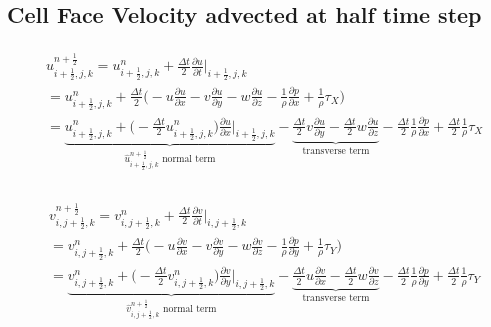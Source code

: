 \documentclass{article}
\numberwithin{equation}{subsection}
\begin{document}
\subsection{Cell Face Velocity advected at half time step}
\begin{align}
\begin{split}
& u_{i+\frac{1}{2},j,k}^{n+\frac{1}{2}} = u_{i+\frac{1}{2},j,k}^n + \frac{\Delta t}{2}\frac{\partial u}{\partial t}|_{i+\frac{1}{2},j,k}\\
& = u_{i+\frac{1}{2},j,k}^n + \frac{\Delta t}{2} \Big( -u\frac{\partial u}{\partial x} -v\frac{\partial u}{\partial y} -w\frac{\partial u}{\partial z} - \frac{1}{\rho}\frac{\partial p}{\partial x} + \frac{1}{\rho}\tau_X\Big) \\
& = \underbrace{u_{i+\frac{1}{2},j,k}^n + \Big( - \frac{\Delta t}{2} u_{i+\frac{1}{2},j,k}^n\Big)\frac{\partial u}{\partial x}|_{i+\frac{1}{2},j,k}}_\text{$\widehat{u}_{i+\frac{1}{2},j,k}^{n+\frac{1}{2}}$ normal term} -\underbrace{\frac{\Delta t}{2}v\frac{\partial u}{\partial y} - \frac{\Delta t}{2}w\frac{\partial u}{\partial z}}_\text{transverse term} - \frac{\Delta t}{2}\frac{1}{\rho}\frac{\partial p}{\partial x} + \frac{\Delta t}{2}\frac{1}{\rho}\tau_X \\
\end{split}
\end{align}

\begin{align}
\begin{split}
& v_{i,j+\frac{1}{2},k}^{n+\frac{1}{2}} = v_{i,j+\frac{1}{2},k}^n + \frac{\Delta t}{2}\frac{\partial v}{\partial t}|_{i,j+\frac{1}{2},k}\\
& = v_{i,j+\frac{1}{2},k}^n + \frac{\Delta t}{2} \Big( -u\frac{\partial v}{\partial x} -v\frac{\partial v}{\partial y} -w\frac{\partial v}{\partial z} - \frac{1}{\rho}\frac{\partial p}{\partial y} + \frac{1}{\rho}\tau_Y\Big) \\
& = \underbrace{v_{i,j+\frac{1}{2},k}^n + \Big( - \frac{\Delta t}{2} v_{i,j+\frac{1}{2},k}^n\Big)\frac{\partial v}{\partial y}|_{i,j+\frac{1}{2},k}}_\text{$\widehat{v}_{i,j+\frac{1}{2},k}^{n+\frac{1}{2}}$ normal term} -\underbrace{\frac{\Delta t}{2}u\frac{\partial v}{\partial x} - \frac{\Delta t}{2}w\frac{\partial v}{\partial z}}_\text{transverse term} - \frac{\Delta t}{2}\frac{1}{\rho}\frac{\partial p}{\partial y} + \frac{\Delta t}{2}\frac{1}{\rho}\tau_Y \\
\end{split}
\end{align}
\end{document}
